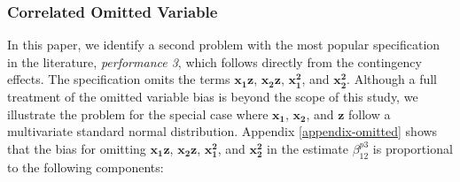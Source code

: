 \documentclass[12pt]{article}
\begin{document}
\subsubsection{Correlated Omitted Variable}

In this paper, we identify a second problem with the most popular specification in the literature, \emph{performance 3}, which follows directly from the contingency effects. The specification omits the terms $\mathbf{x_1 z}$, $\mathbf{x_2 z}$, $\mathbf{x_1^2}$, and $\mathbf{x_2^2}$. Although a full treatment of the omitted variable bias is beyond the scope of this study, we illustrate the problem for the special case where $\mathbf{x_1}$, $\mathbf{x_2}$, and $\mathbf{z}$ follow a multivariate standard normal distribution. Appendix \ref{appendix-omitted} shows that the bias for omitting $\mathbf{x_1 z}$, $\mathbf{x_2 z}$, $\mathbf{x_1^2}$, and $\mathbf{x_2^2}$ in the estimate $\beta^{p3}_{12}$ is proportional to the following components:
\end{document}

